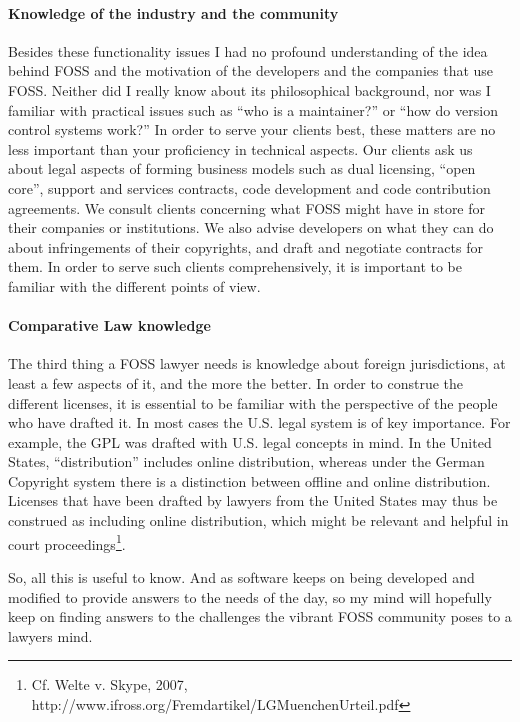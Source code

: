\paragraph*{Knowledge of the industry and the community}
Besides these functionality issues I had no profound understanding of the idea behind FOSS and the motivation of the developers and the companies that use FOSS. Neither did I really know about its philosophical background, nor was I familiar with practical issues such as “who is a maintainer?” or “how do version control systems work?” In order to serve your clients best, these matters are no less important than your proficiency in technical aspects.  
Our clients ask us about legal aspects of forming business models such as dual licensing, “open core”, support and services contracts, code development and code contribution agreements. We consult clients concerning what FOSS might have in store for their companies or institutions. We also advise developers on what they can do about infringements of their copyrights, and draft and negotiate contracts for them. In order to serve such clients comprehensively, it is important to be familiar with the different points of view.  

\paragraph*{Comparative Law knowledge}
The third thing a FOSS lawyer needs is knowledge about foreign jurisdictions, at least a few aspects of it, and the more the better. In order to construe the different licenses, it is essential to be familiar with the perspective of the people who have drafted it. In most cases the U.S. legal system is of key importance. For example, the GPL was drafted with U.S. legal concepts in mind. In the United States, “distribution” includes online distribution, whereas under the German Copyright system there is a distinction between offline and online distribution. Licenses that have been drafted by lawyers from the United States may thus be construed as including online distribution, which might be relevant and helpful in court proceedings\footnote{Cf. Welte v. Skype, 2007,  http://www.ifross.org/Fremdartikel/LGMuenchenUrteil.pdf}.
 
So, all this is useful to know. And as software keeps on being developed and modified to provide answers to the needs of the day, so my mind will hopefully keep on finding answers to the challenges the vibrant FOSS community poses to a lawyers mind.